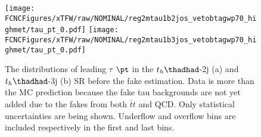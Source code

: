 \begin{figure}[H]
\centering
\texttt{[image: \\FCNCFigures/xTFW/raw/NOMINAL/reg2mtau1b2jos\_vetobtagwp70\_highmet/tau\_pt\_0.pdf]}
\texttt{[image: \\FCNCFigures/xTFW/raw/NOMINAL/reg2mtau1b3jos\_vetobtagwp70\_highmet/tau\_pt\_0.pdf]}
\caption{ The distributions of leading $\tau$ $\pt$ in the $t_h\thadhad$-2j (a) and $t_h\thadhad$-3j (b) SR before the fake estimation. Data is more than the MC prediction because the fake tau backgrounds are not yet added due to the fakes from both $\bar{t}t$ and QCD. Only
statistical uncertainties are being shown. Underflow and overflow bins are included respectively in the first and last bins.}
\label{fig:intro_os_pre_hadhad}
\end{figure}
